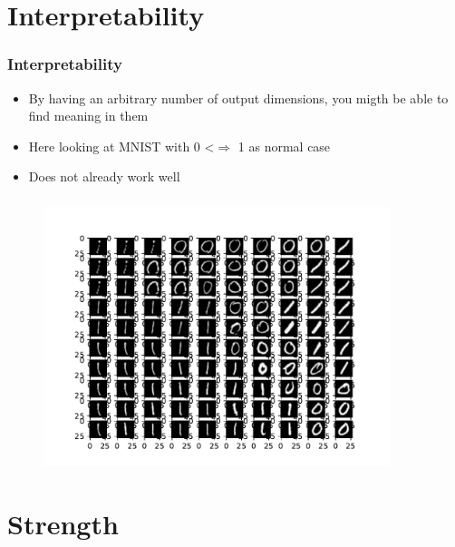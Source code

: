 \documentclass[hyperref={pdfpagelabels=false}]{beamer}
\begin{document}
\section{Interpretability}\label{sec:Interpretability}



\begin{frame}[label=Interpretability]
\frametitle{Interpretability}
\begin{itemize}

    \item By having an arbitrary number of output dimensions, you migth be able to find meaning in them

    \item Here looking at MNIST with 0 <$\Rightarrow$ 1 as normal case

    \item Does not already work well


\end{itemize}
\end{frame}



\begin{frame}[label=]
\frametitle{}
\begin{figure}[H] 
  \centering
\includegraphics[width=0.9\textwidth]{../imgs/map}
\label{fig:map}
  \end{figure}


\end{frame}




\newpage
\section{Strength}\label{sec:Strength}
\end{document}
